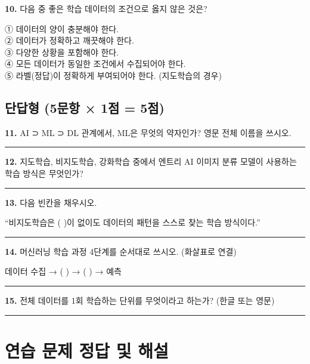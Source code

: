 \documentclass[a4paper, 11pt]{article}
\begin{document}
\textbf{10.} 다음 중 좋은 학습 데이터의 조건으로 옳지 않은 것은?

① 데이터의 양이 충분해야 한다.\\
② 데이터가 정확하고 깨끗해야 한다.\\
③ 다양한 상황을 포함해야 한다.\\
④ 모든 데이터가 동일한 조건에서 수집되어야 한다.\\
⑤ 라벨(정답)이 정확하게 부여되어야 한다. (지도학습의 경우)

\hypertarget{uxb2e8uxb2f5uxd615-5uxbb38uxd56d-1uxc810-5uxc810}{%
\subsection{단답형 (5문항 × 1점 =
5점)}\label{uxb2e8uxb2f5uxd615-5uxbb38uxd56d-1uxc810-5uxc810}}

\textbf{11.} AI ⊃ ML ⊃ DL 관계에서, ML은 무엇의 약자인가? 영문 전체
이름을 쓰시오.

\begin{center}\rule{0.5\linewidth}{0.5pt}\end{center}

\textbf{12.} 지도학습, 비지도학습, 강화학습 중에서 엔트리 AI 이미지 분류
모델이 사용하는 학습 방식은 무엇인가?

\begin{center}\rule{0.5\linewidth}{0.5pt}\end{center}

\textbf{13.} 다음 빈칸을 채우시오.

``비지도학습은 ( )이 없이도 데이터의 패턴을 스스로 찾는 학습 방식이다.''

\begin{center}\rule{0.5\linewidth}{0.5pt}\end{center}

\textbf{14.} 머신러닝 학습 과정 4단계를 순서대로 쓰시오. (화살표로 연결)

데이터 수집 → ( ) → ( ) → 예측

\begin{center}\rule{0.5\linewidth}{0.5pt}\end{center}

\textbf{15.} 전체 데이터를 1회 학습하는 단위를 무엇이라고 하는가? (한글
또는 영문)

\begin{center}\rule{0.5\linewidth}{0.5pt}\end{center}

\newpage

\hypertarget{uxc5f0uxc2b5-uxbb38uxc81c-uxc815uxb2f5-uxbc0f-uxd574uxc124}{%
\section{ 연습 문제 정답 및
해설}\label{uxc5f0uxc2b5-uxbb38uxc81c-uxc815uxb2f5-uxbc0f-uxd574uxc124}}
\end{document}
